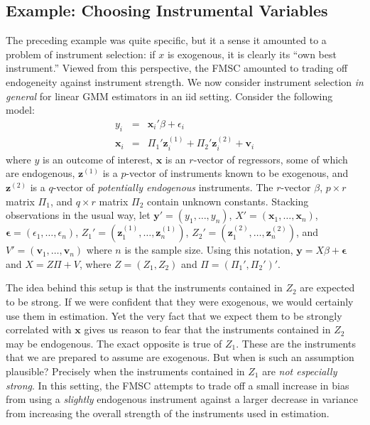 \documentclass[12pt]{article}
\theoremstyle{definition}
\begin{document}
\subsection{Example: Choosing Instrumental Variables}
\label{sec:chooseIVlowlevel}
The preceding example was quite specific, but it a sense it amounted to a problem of instrument selection: if $x$ is exogenous, it is clearly its ``own best instrument.'' 
Viewed from this perspective, the FMSC amounted to trading off endogeneity against instrument strength. We now consider instrument selection \emph{in general} for linear GMM estimators in an iid setting. 
Consider the following model:
\begin{eqnarray}
    y_i &=& \mathbf{x}_i' \beta +  \epsilon_i\\
    \mathbf{x}_i &=&  \Pi_1' \mathbf{z}_{i}^{(1)} + \Pi_2'\mathbf{z}_{i}^{(2)} + \mathbf{v}_i
\end{eqnarray}
where $y$ is an outcome of interest, $\mathbf{x}$ is an $r$-vector of regressors, some of which are endogenous, $\mathbf{z}^{(1)}$ is a $p$-vector of instruments known to be exogenous, and $\mathbf{z}^{(2)}$ is a $q$-vector  of \emph{potentially endogenous} instruments. 
The $r$-vector $\beta$, $p\times r$ matrix $\Pi_1$, and $q\times r$ matrix $\Pi_2$ contain unknown constants. Stacking observations in the usual way, let $\mathbf{y}' = (y_1, \hdots, y_n)$, $X' = (\mathbf{x}_1, \hdots, \mathbf{x}_n)$, $\boldsymbol{\epsilon} = (\epsilon_1, \hdots, \epsilon_n)$, 
$Z_1' = (\mathbf{z}_{1}^{(1)}, \hdots, \mathbf{z}_{n}^{(1)})$, $Z_2' = (\mathbf{z}_{1}^{(2)}, \hdots, \mathbf{z}_{n}^{(2)})$, and $V' = (\mathbf{v}_1, \hdots, \mathbf{v}_n)$ where $n$ is the sample size.
Using this notation, $\mathbf{y} = X\beta +\boldsymbol{\epsilon}$ and $X =  Z \Pi + V$, where $Z = (Z_1, Z_2)$ and $\Pi = (\Pi_1', \Pi_2')'$. 

The idea behind this setup is that the instruments contained in $Z_2$ are expected to be strong. 
If we were confident that they were exogenous, we would certainly use them in estimation. 
Yet the very fact that we expect them to be strongly correlated with $\mathbf{x}$ gives us reason to fear that the instruments contained in $Z_2$ may be endogenous. 
The exact opposite is true of $Z_1$. These are the instruments that we are prepared to assume are exogenous. 
But when is such an assumption plausible? Precisely when the instruments contained in $Z_1$ are \emph{not especially strong}. 
In this setting, the FMSC attempts to trade off a small increase in bias from using a \emph{slightly} endogenous instrument against a larger decrease in variance from increasing the overall strength of the instruments used in estimation.
\end{document}
